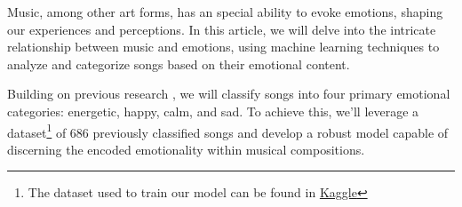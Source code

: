 \documentclass[11pt,]{article}
\begin{document}
Music, among other art forms, has an special ability to evoke emotions,
shaping our experiences and perceptions. In this article, we will delve
into the intricate relationship between music and emotions, using
machine learning techniques to analyze and categorize songs based on
their emotional content.

Building on previous research \citep{data1}, we will classify songs into
four primary emotional categories: energetic, happy, calm, and sad. To
achieve this, we'll leverage a dataset\footnote{The dataset used to
  train our model can be found in
  \href{https://www.kaggle.com/datasets/musicblogger/spotify-music-data-to-identify-the-moods}{Kaggle}}
of 686 previously classified songs and develop a robust model capable of
discerning the encoded emotionality within musical compositions.
\end{document}
